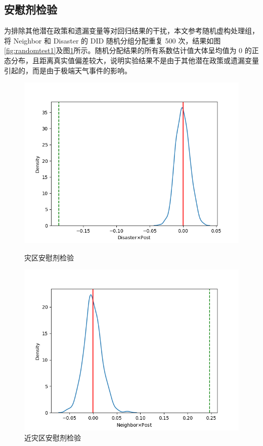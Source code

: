 \subsection{安慰剂检验}
为排除其他潜在政策和遗漏变量等对回归结果的干扰，本文参考\citet{CYJJ202104009}随机虚构处理组，将 Neighbor 和 Disaster 的 DID 随机分组分配重复 500 次，结果如图\ref{fig:randomtest1}及图\ref{fig:randomtest2}所示。随机分配结果的所有系数估计值大体呈均值为 0 的正态分布，且距离真实值偏差较大，说明实验结果不是由于其他潜在政策或遗漏变量引起的，而是由于极端天气事件的影响。
\begin{figure}[H]
    \begin{minipage}{0.48\linewidth}
        \includegraphics[width=\linewidth]{lib/img/random_Disaster.png}
        \caption{灾区安慰剂检验}\label{fig:randomtest1}
    \end{minipage}
    \begin{minipage}{0.48\linewidth}
        \includegraphics[width=\linewidth]{lib/img/random_Neighbor.png}
        \caption{近灾区安慰剂检验}\label{fig:randomtest2}
    \end{minipage}
\end{figure}

